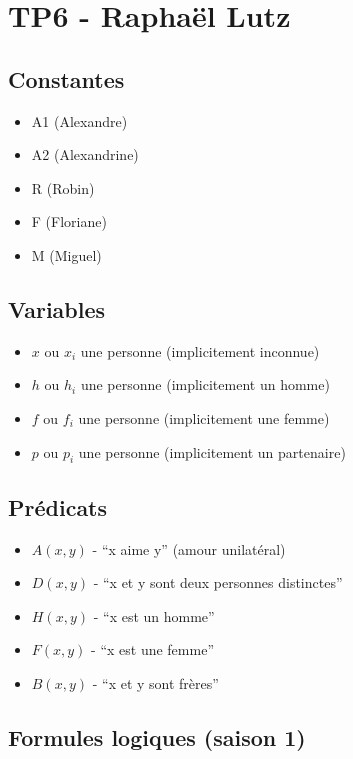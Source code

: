 \documentclass[10pt]{extarticle}
\begin{document}

\section*{TP6 - Raphaël Lutz}

\subsection*{Constantes}
\begin{itemize}
\setlength\itemsep{0cm}
\item A1 (Alexandre)
\item A2 (Alexandrine)
\item R (Robin)
\item F (Floriane)
\item M (Miguel)
\end{itemize}

\subsection*{Variables}
\begin{itemize}
\setlength\itemsep{0cm}
\item $x$ ou $x_i$ une personne (implicitement inconnue)
\item $h$ ou $h_i$ une personne (implicitement un homme)
\item $f$ ou $f_i$ une personne (implicitement une femme)
\item $p$ ou $p_i$ une personne (implicitement un partenaire)
\end{itemize}

\subsection*{Prédicats}
\begin{itemize}
\setlength\itemsep{0cm}
\item $A(x,y)$ - ``x aime y'' (amour unilatéral)
\item $D(x,y)$ - ``x et y sont deux personnes distinctes''
\item $H(x,y)$ - ``x est un homme''
\item $F(x,y)$ - ``x est une femme''
\item $B(x,y)$ - ``x et y sont frères''
\end{itemize}

\subsection*{Formules logiques (saison 1)}
\end{document}
